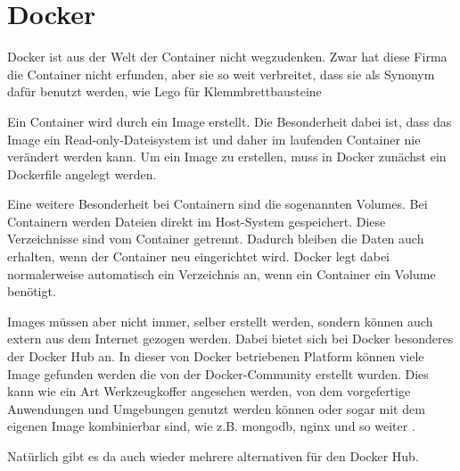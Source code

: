 \section{Docker}
Docker ist aus der Welt der Container nicht wegzudenken. 
Zwar hat diese Firma die Container nicht erfunden, aber sie so weit verbreitet, dass sie als Synonym dafür benutzt werden, wie Lego für Klemmbrettbausteine

Ein Container wird durch ein Image erstellt. Die Besonderheit dabei ist, dass das Image ein Read-only-Dateisystem ist und daher im laufenden Container nie verändert werden kann.
Um ein Image zu erstellen, muss in Docker zunächst ein Dockerfile angelegt werden.

Eine weitere Besonderheit bei Containern sind die sogenannten Volumes. Bei Containern werden Dateien direkt im Host-System gespeichert. Diese Verzeichnisse sind vom Container getrennt.
Dadurch bleiben die Daten auch erhalten, wenn der Container neu eingerichtet wird.
Docker legt dabei normalerweise automatisch ein Verzeichnis an, wenn ein Container ein Volume benötigt.

Images müssen aber nicht immer, selber erstellt werden, sondern können auch extern aus dem Internet gezogen werden.
Dabei bietet sich bei Docker besonderes der Docker Hub an. In dieser von Docker betriebenen Platform können viele Image gefunden werden die von der Docker-Community erstellt wurden.
Dies kann wie ein Art Werkzeugkoffer angesehen werden, von dem vorgefertige Anwendungen und Umgebungen genutzt werden können oder sogar mit dem eigenen Image kombinierbar sind,
wie z.B. mongodb, nginx und so weiter \parencite[vgl. 50]{kofler2023docker}. 

Natürlich gibt es da auch wieder mehrere alternativen für den Docker Hub.